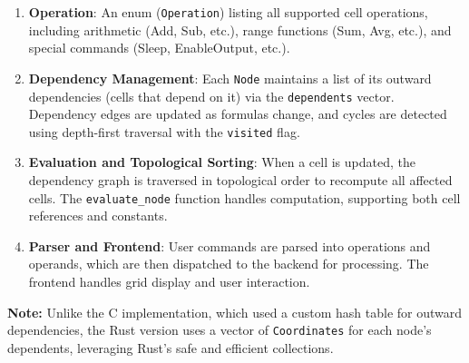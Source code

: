 \documentclass{article}
\begin{document}
\begin{enumerate}
\item \textbf{Operation}: An enum (\texttt{Operation}) listing all supported cell operations, including arithmetic (Add, Sub, etc.), range functions (Sum, Avg, etc.), and special commands (Sleep, EnableOutput, etc.).
\item \textbf{Dependency Management}: Each \texttt{Node} maintains a list of its outward dependencies (cells that depend on it) via the \texttt{dependents} vector. Dependency edges are updated as formulas change, and cycles are detected using depth-first traversal with the \texttt{visited} flag.
\item \textbf{Evaluation and Topological Sorting}: When a cell is updated, the dependency graph is traversed in topological order to recompute all affected cells. The \texttt{evaluate\_node} function handles computation, supporting both cell references and constants.
\item \textbf{Parser and Frontend}: User commands are parsed into operations and operands, which are then dispatched to the backend for processing. The frontend handles grid display and user interaction.
\end{enumerate}

\textbf{Note:} Unlike the C implementation, which used a custom hash table for outward dependencies, the Rust version uses a vector of \texttt{Coordinates} for each node's dependents, leveraging Rust's safe and efficient collections.
\end{document}
